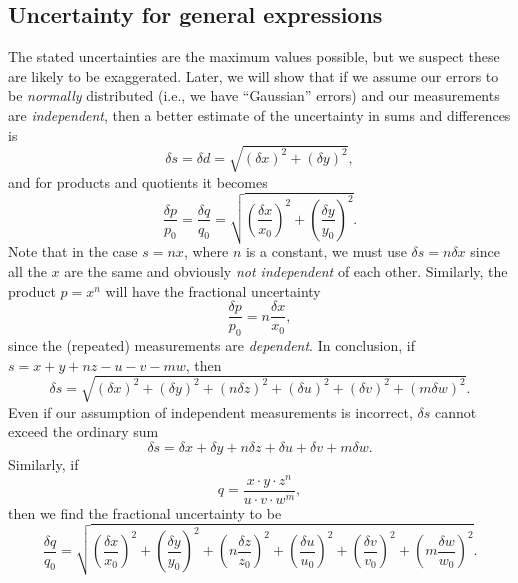 \subsection{Uncertainty for general expressions}
The stated uncertainties are the maximum values possible, but we suspect these are likely to be exaggerated.
Later, we will show that if we assume our errors to be \emph{normally} distributed (i.e., we have 
``Gaussian'' errors) and our measurements are \emph{independent}, then a better estimate of the uncertainty in 
sums and differences is 
\begin{equation}
\delta s = \delta d = \sqrt{ (\delta x)^2 + (\delta y) ^2},
\end{equation}
	and for products and quotients it becomes
\begin{equation}
\frac{\delta p }{p_0} = \frac{\delta q}{q_0} = 
\sqrt{ \left (  \frac{\delta x}{x_0} \right)^2 + \left( \frac{\delta y}{y_0}  \right)^2 }.
\end{equation}	 
Note that in the case $s = nx$, where $n$ is a constant, we must use $\delta s = n\delta x$ since all the $x$ are the 
same and obviously \emph{not independent} of each other.  Similarly, the product $p = x^n$ will have the 
fractional uncertainty
\begin{equation}
\frac{\delta p }{p_0} = n \frac{\delta x}{x_0},
\label{eq:poweruncertainty}
\end{equation}
since the (repeated) measurements are \emph{dependent}.  In conclusion, if $s = x + y + nz - u - v - mw$, then
\begin{equation}
\delta s = \sqrt{ (\delta x)^2 + (\delta y)^2 + (n \delta z)^2 +(\delta u)^2 + (\delta v)^2
+ (m \delta w)^2    }.
\end{equation}
Even if our assumption of independent measurements is incorrect, $\delta s$ cannot exceed 
the ordinary sum
\begin{equation}
\delta s = \delta x + \delta y + n \delta z + \delta u + \delta v + m \delta  w.
\label{eq:uncert_sum}
\end{equation}
Similarly, if
\begin{equation}
q = \frac{x \cdot y \cdot z^n}{u \cdot v \cdot w ^m},
\end{equation}
then we find the fractional uncertainty to be
\begin{equation}
\frac{\delta q }{q_0} = \sqrt{ \left ( \frac{\delta x}{x_0}   \right )^2 +
\left ( \frac{\delta y}{y_0}   \right )^2 + 
\left ( n \frac{\delta z}{z_0}   \right )^2 + \left ( \frac{\delta u}{u_0}   \right )^2  + \left ( \frac{\delta v}{v_0}   \right ) ^2 + 
\left ( m \frac{\delta w}{w_0}   \right )^2         }.
\label{eq:uncert_prod}
\end{equation}
